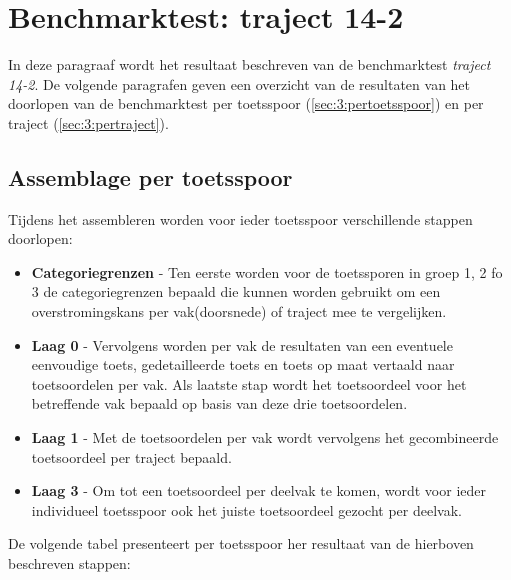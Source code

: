 \section{Benchmarktest: traject 14-2}
	\label{ch:benchmarktTest3}
In deze paragraaf wordt het resultaat beschreven van de benchmarktest \textit{traject 14-2}. De volgende paragrafen geven een overzicht van de resultaten van het doorlopen van de benchmarktest per toetsspoor (\autoref{sec:3:pertoetsspoor}) en per traject (\autoref{sec:3:pertraject}).

\subsection{Assemblage per toetsspoor}
	\label{sec:3:pertoetsspoor}
Tijdens het assembleren worden voor ieder toetsspoor verschillende stappen doorlopen:
\begin{itemize}
	\item \textbf{Categoriegrenzen} - Ten eerste worden voor de toetssporen in groep 1, 2 fo 3 de categoriegrenzen bepaald die kunnen worden gebruikt om een overstromingskans per vak(doorsnede) of traject mee te vergelijken.
	\item \textbf{Laag 0} - Vervolgens worden per vak de resultaten van een eventuele eenvoudige toets, gedetailleerde toets en toets op maat vertaald naar toetsoordelen per vak. Als laatste stap wordt het toetsoordeel voor het betreffende vak bepaald op basis van deze drie toetsoordelen.
	\item \textbf{Laag 1} - Met de toetsoordelen per vak wordt vervolgens het gecombineerde toetsoordeel per traject bepaald.
	\item \textbf{Laag 3} - Om tot een toetsoordeel per deelvak te komen, wordt voor ieder individueel toetsspoor ook het juiste toetsoordeel gezocht per deelvak.
\end{itemize}

De volgende tabel presenteert per toetsspoor her resultaat van de hierboven beschreven stappen:


